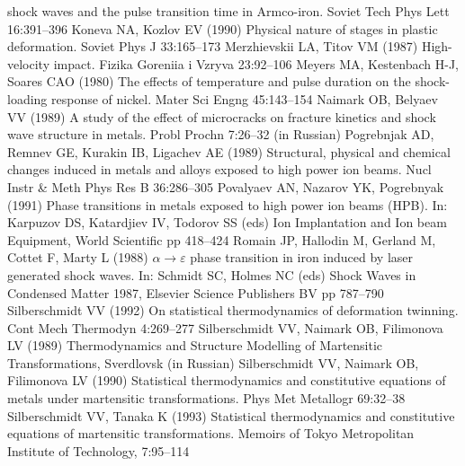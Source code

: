 \documentclass[sw,bibself]{svjour}
\begin{document}
\begin{thebibliography}{88.}
shock waves and the pulse transition time in Armco-iron.
Soviet Tech Phys Lett 16:391--396
Koneva NA, Kozlov EV (1990) Physical nature of stages in plastic
deformation. Soviet Phys J 33:165--173
Merzhievskii LA, Titov VM (1987) High-velocity impact. Fizika Goreniia
i Vzryva 23:92--106
Meyers MA, Kestenbach H-J, Soares CAO (1980) The effects of temperature
and pulse duration on the shock-loading response of nickel.
Mater Sci Engng 45:143--154
Naimark OB, Belyaev VV (1989) A study of the effect of microcracks on
fracture kinetics and shock wave structure in metals.
Probl Prochn 7:26--32 (in Russian)
Pogrebnjak AD, Remnev GE, Kurakin IB, Ligachev AE (1989) Structural,
physical and chemical changes induced in metals and alloys exposed
to high power ion beams. Nucl Instr \& Meth Phys Res B 36:286--305
Povalyaev AN, Nazarov YK, Pogrebnyak (1991) Phase transitions
in metals exposed to high power ion beams (HPB). In: Karpuzov DS,
Katardjiev IV, Todorov SS (eds) Ion Implantation and Ion beam Equipment,
World Scientific pp 418--424
Romain JP, Hallodin M, Gerland M, Cottet F, Marty L (1988)
$\alpha  \to \varepsilon$ phase transition in iron induced by laser
generated shock waves.
In: Schmidt SC, Holmes NC (eds) Shock  Waves in Condensed Matter 1987,
Elsevier Science Publishers BV pp 787--790
Silberschmidt VV (1992) On statistical thermodynamics of deformation
twinning. Cont Mech Thermodyn 4:269--277
Silberschmidt VV, Naimark OB, Filimonova LV (1989) Thermodynamics and
Structure Modelling of Martensitic Transformations, Sverdlovsk (in Russian)
Silberschmidt VV, Naimark OB, Filimonova LV (1990) Statistical
thermodynamics and constitutive equations of metals under martensitic
transformations. Phys Met Metallogr 69:32--38
Silberschmidt VV, Tanaka K (1993) Statistical thermodynamics and
constitutive equations of martensitic transformations.
Memoirs of Tokyo Metropolitan Institute of Technology, 7:95--114
\end{thebibliography}
\end{document}

